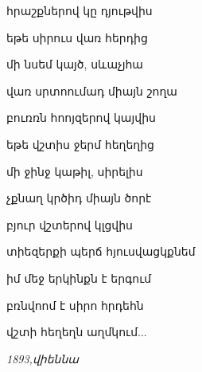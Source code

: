                                       հրաշքներով կը դյութվիս






                                      եթե սիրուս վառ հերդից

                                      մի նսեմ կայծ, սևաչյհա
                                       

                                       վառ սրտոումադ  միայն շողա


                                         բուռռն հոոյզերով կայվիս






                          եթե վշտիս ջերմ հեղեղից

                          մի ջինջ կաթիլ, սիրելիս
                          


                          չքնաղ կրծիդ միայն ծորէ
                          

                            բյուր վշտերով կլցվիս



                              տիեզերքի պերճ հյուսվացկքնեմ

                            
                            իմ մեջ երկինքն է երգում 


                            բռնվոոմ է սիրո հրդեհն


                            վշտի հեղեղն աղմկում...


                                                
                                                \it{1893,վիեննա}







